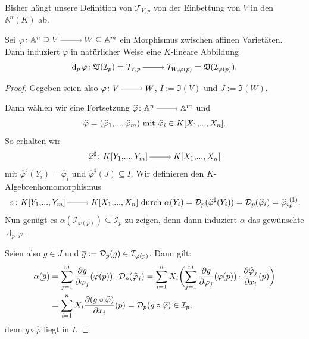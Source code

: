 \documentclass[a4paper,12pt]{scrbook}
\theoremstyle{keinenummern} %
\theoremstyle{mitnummern}
\theoremstyle{unserbeweis}
\newtheorem{proof}{Beweis}
\def\A{\mathbb{A}}
\def\V{\mathfrak{V}}
\def\I{\mathfrak{I}}
\def\II{\mathcal{I}}
\newcommand{\DD}{\mathcal{D}} %
\def\T{\mathcal{T}}
\renewcommand{\dotsc}{\ensuremath{\!...}}
\newcommand{\ra}{\raisebox{-1pt}{\tikz{\draw[thin,shorten >=3pt, ->] (0,0) node{\hspace*{-2pt}} -- node{} (1,0);}}\penalty1000\relax}
\newcommand{\dach}{\widehat}
\def\Bar#1{\ensuremath\overline{#1}}
\newcommand{\polyx}[1][n]{\ensuremath%
  [X_{1},\dotsc,X_{#1}]}
\begin{document}
\begin{w} Bisher hängt unsere Definition von $\T_{V,p}$ von der Einbettung von $V$ in den $\A^{n}(K)$ ab.\end{w}

\begin{bem}\label{3.3.6}
Sei $\varphi\colon\A^{n}\supseteq V\ra W\subseteq\A^{m}$ ein Morphismus zwischen affinen Varietäten. Dann induziert $\varphi$ in natürlicher Weise eine $K$-lineare Abbildung
\[\operatorname{d}_{p}\varphi\colon\V(\II_{p})=\T_{V,p}\ra\T_{W,\varphi(p)}=\V(\II_{\varphi(p)}).\]
\end{bem}

\begin{proof}
Gegeben seien also $\varphi\colon V\ra W$, $I:=\I(V)$ und $J:=\I(W)$.

Dann wählen wir eine Fortsetzung $\dach{\varphi}\colon\A^{n}\ra\A^{m}$ und 
\[\dach{\varphi}=(\dach{\varphi}_{1},\dotsc,\dach{\varphi}_{m})\text{ mit }\dach{\varphi}_{i}\in K\polyx.\] 
So erhalten wir
\[\dach{\varphi}^{\sharp}\colon K[Y_{1},\dotsc,Y_{m}]\ra K\polyx\]
mit $\dach{\varphi}^{\sharp}(Y_{i})=\dach{\varphi}_{i}$ und $\dach{\varphi}^{\sharp}(J)\subseteq I$. Wir definieren den $K$-Algebrenhomomorphismus
\[\alpha\colon K[Y_{1},\dotsc,Y_{m}]\ra K\polyx\text{ durch }\alpha(Y_{i})=\DD_{p}(\dach{\varphi}^{\sharp}(Y_{i}))=\DD_{p}(\dach{\varphi}_{i})=\dach{\varphi}_{i}\mbox{}^{(1)}_{p}.\]
Nun genügt es $\alpha(\II_{\varphi(p)})\subseteq\II_{p}$ zu zeigen, denn dann induziert $\alpha$ das gewünschte $\operatorname{d}_{p}\varphi$.

Seien also $g\in J$ und $\Bar{g}:=\DD_{p}(g)\in\II_{\varphi(p)}$. Dann gilt:
\begin{align*}
\alpha(\Bar{g})&=\sum_{j=1}^{m}\frac{\partial g}{\partial \varphi_{j}}(\varphi(p))\cdot \DD_{p}(\dach{\varphi}_{j})=\sum_{i=1}^{n}X_{i}\biggl(\sum_{j=1}^{m}\frac{\partial g}{\partial \varphi_{j}}(\varphi(p))\cdot\frac{\partial\dach{\varphi}_{j}}{\partial x_{i}}(p)\biggr)\\
&=\sum_{i=1}^{n}X_{i}\frac{\partial (g\circ \dach{\varphi})}{\partial x_{i}}(p)=\DD_{p}(g\circ\dach{\varphi})\in\II_{p},
\end{align*}
denn $g\circ\dach{\varphi}$ liegt in $I$.
\end{proof}
\end{document}
